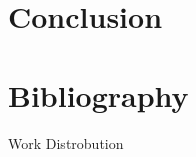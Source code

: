 \documentclass[10pt]{article}
\begin{document}
\section{Conclusion}

\newpage
\nocite{*}
\section{Bibliography}





\newpage

Work Distrobution
\end{document}
